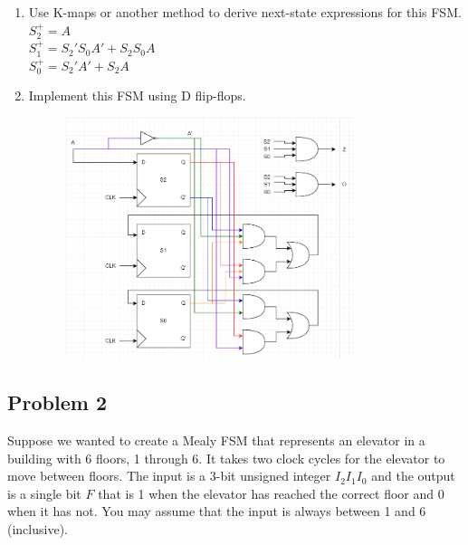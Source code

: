 \documentclass{article}
\begin{document}
\begin{enumerate}[label=\alph*.]
\item Use K-maps or another method to derive next-state expressions for this FSM. \\
\textbf{
$S_2^+ = A$\\
$S_1^+ = S_2'S_0A'+S_2S_0A$ \\
$S_0^+ = S_2'A' + S_2A$
}
\item Implement this FSM using D flip-flops.
\begin{figure}[!h]
    \centering
    \includegraphics[width=0.8\textwidth]{figures/fsm1e-solution.png}
\end{figure}
\end{enumerate}

\newpage
\subsection*{Problem 2}

Suppose we wanted to create a Mealy FSM that represents an elevator in a building with 6 floors, 1 through 6. It takes two clock cycles for the elevator to move between floors. The input is a 3-bit unsigned integer $I_2I_1I_0$ and the output is a single bit $F$ that is 1 when the elevator has reached the correct floor and 0 when it has not. You may assume that the input is always between 1 and 6 (inclusive).
\end{document}
